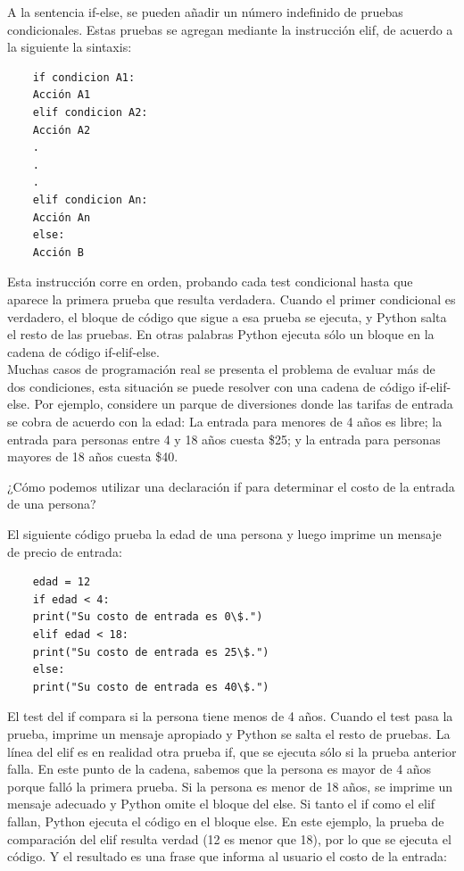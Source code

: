 A la sentencia {\ttfamily if-else}, se pueden añadir un número indefinido de pruebas condicionales. Estas pruebas  se agregan mediante la instrucción {\ttfamily elif}, de acuerdo a la siguiente la sintaxis:

\begin{lstlisting}
	if condicion A1:
	Acción A1
	elif condicion A2:
	Acción A2
	.
	.
	.     
	elif condicion An:
	Acción An
	else:
	Acción B
\end{lstlisting}

Esta instrucción corre en orden, probando cada test condicional hasta que aparece la primera prueba que resulta verdadera.  Cuando el primer condicional es verdadero, el bloque de código que sigue a esa prueba se ejecuta, y Python salta el resto de las pruebas. En otras palabras Python ejecuta sólo un bloque en la cadena de código {\ttfamily if-elif-else}.\\


Muchas casos de programación real se presenta el problema de evaluar más de dos condiciones, esta situación se puede resolver con una cadena de código {\ttfamily if-elif-else}.  Por ejemplo, considere un parque de diversiones donde las tarifas de entrada se cobra de acuerdo con la edad: La entrada para menores de 4 años es libre; la entrada para personas entre 4 y 18 años cuesta \$25; y la entrada para personas mayores de 18 años cuesta \$40.

¿Cómo podemos utilizar una declaración {\ttfamily if} para determinar el costo de la entrada de una persona?

El siguiente código prueba la edad de una persona y luego imprime un mensaje de precio de entrada:


\hspace{-2.4cm}{\ttfamily \scriptsize parque1.py}\vspace{-0.52cm}
\begin{lstlisting}		
	edad = 12
	if edad < 4:
	print("Su costo de entrada es 0\$.")
	elif edad < 18:
	print("Su costo de entrada es 25\$.")
	else:
	print("Su costo de entrada es 40\$.")
\end{lstlisting}	

El test del {\ttfamily if} compara si la persona tiene menos de 4 años. Cuando el test pasa la prueba,  imprime un mensaje apropiado y Python se salta el resto de pruebas. La línea del {\ttfamily elif} es en realidad otra prueba {\ttfamily if}, que se ejecuta sólo si la prueba anterior falla. En este punto de la cadena, sabemos que la persona es mayor de  4 años porque falló la primera prueba. Si la persona es menor de 18 años, se imprime un mensaje adecuado y Python omite el bloque del {\ttfamily else}. Si tanto el  {\ttfamily if} como el  {\ttfamily elif} fallan, Python ejecuta el código en el bloque {\ttfamily else}. En este ejemplo,  la prueba de comparación del {\ttfamily elif}  resulta verdad (12 es menor que 18), por lo que se ejecuta el código. Y el resultado es una frase que informa al usuario el costo de la entrada:\vspace{0.08cm}

